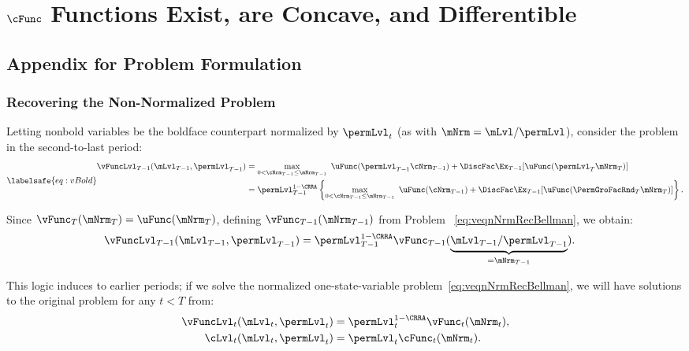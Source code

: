 \documentclass[\econtexRoot/BufferStockTheory]{subfiles}
\begin{document}
\section{\texorpdfstring{$\cFunc$}{c} Functions Exist, are Concave, and Differentible}\label{sec:ApndxConcaveCFunc}

\subsection{Appendix for Problem Formulation}

\subsubsection{Recovering the Non-Normalized Problem}\label{sec:recoverLevels}
Letting nonbold variables be the boldface counterpart normalized by $\permLvl_{t}$ (as with $\mNrm=\mLvl/\permLvl$), consider the problem in the second-to-last period:
\begin{equation}\labelsafe{eq:vBold}
  \begin{split}
    \vFuncLvl_{T-1}(\mLvl_{T-1},\permLvl_{T-1})
    & =  \max_{0< \cNrm_{T-1}\leq \mNrm_{T-1}}~
    \uFunc(\permLvl_{T-1}\cNrm_{T-1}) + \DiscFac  \Ex_{T-1} [\uFunc(\permLvl_{T}{\mNrm}
    _{T})]  \\
    & = \permLvl_{T-1}^{1-\CRRA}
    \left\{\max_{0<\cNrm_{T-1}\leq \mNrm_{T-1}}~ \uFunc(\cNrm_{T-1}) + \DiscFac \Ex_{T-1} [ \uFunc( {\PermGroFacRnd}_{T}
      {\mNrm}_{T}) ] \right\}.
  \end{split}
\end{equation}

\hypertarget{The-Related-Problem}{}

Since $\vFunc_{T}(\mNrm_{T}) = \uFunc(\mNrm_{T})$, defining $\vFunc_{T-1}(\mNrm_{T-1})$ from Problem ~\eqref{eq:veqnNrmRecBellman}, we obtain:
\begin{align*}
  \vFuncLvl_{T-1}(\mLvl_{T-1},\permLvl_{T-1})  & = \permLvl_{T-1}^{1-\CRRA} \vFunc_{T-1}(\underbrace{\mLvl_{T-1}/\permLvl_{T-1}}_{=\mNrm_{T-1}}).
\end{align*}

This logic induces to earlier periods; if we solve the normalized one-state-variable problem~\eqref{eq:veqnNrmRecBellman}, we will have solutions to the original problem for any $t<T$ from:
\begin{align*}
  \vFuncLvl_{t}(\mLvl_{t},\permLvl_{t})  & = \permLvl_{t}^{1-\CRRA}\vFunc_{t}(\mNrm_{t}),
  \\ \cLvl_{t}(\mLvl_{t},\permLvl_{t})  & = \permLvl_{t}\cFunc_{t}(\mNrm_{t}).
\end{align*}
\end{document}
